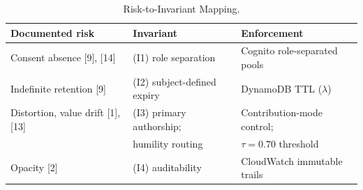 \begin{table}[htbp]
\caption{Risk-to-Invariant Mapping.}
\label{tab:risk_invariants}
\centering
\begin{tabular}{lll}
\toprule
\textbf{Documented risk} & \textbf{Invariant} & \textbf{Enforcement} \\
\midrule
Consent absence [9], [14]       & (I1) role separation         & Cognito role-separated pools \\
Indefinite retention [9]        & (I2) subject-defined expiry  & DynamoDB TTL ($\lambda$) \\
Distortion, value drift [1], [13]& (I3) primary authorship;    & Contribution-mode control; \\
                                & \hspace{1.5em} humility routing & $\tau = 0.70$ threshold \\
Opacity [2]                     & (I4) auditability            & CloudWatch immutable trails \\
\bottomrule
\end{tabular}
\end{table}
